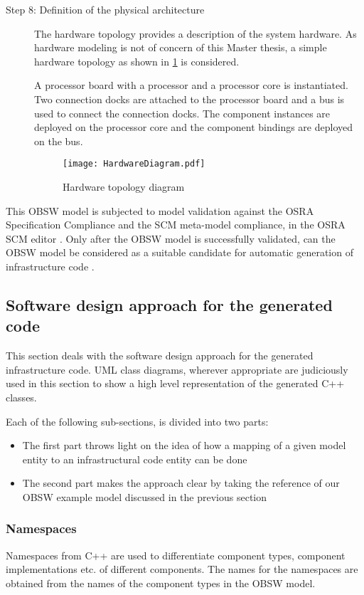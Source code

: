 \begin{description}
\item [Step 8: Definition of the physical architecture] The hardware topology provides a description of the system hardware. As hardware modeling is not of concern of this Master thesis, a simple hardware topology as shown in \cref{fig: Ex. Hardware topology} is considered. 

A processor board with a processor and a processor core is instantiated. Two connection docks are attached to the processor board and a bus is used to connect the connection docks. The component instances are deployed on the processor core and the component bindings are deployed on the bus.

\begin{figure}[h]
	\centering
	\texttt{[image: HardwareDiagram.pdf]}
	\caption{Hardware topology diagram}
	\label{fig: Ex. Hardware topology}
\end{figure}
 
\end{description}

This OBSW model is subjected to model validation against the OSRA Specification Compliance and the SCM meta-model compliance, in the OSRA SCM editor \cite{OSRAEditor}. Only after the OBSW model is successfully validated, can the OBSW model be considered as a suitable candidate for automatic generation of infrastructure code \cite{OSRAEditor}.  
   
\subsection{Software design approach for the generated code}
This section deals with the software design approach for the generated infrastructure code. UML class diagrams, wherever appropriate are judiciously used in this section to show a high level representation of the generated C++ classes. 

Each of the following sub-sections, is divided into two parts:
\begin{itemize}
\item The first part throws light on the idea of how a mapping of a given model entity to an infrastructural code entity can be done
\item The second part makes the approach clear by taking the reference of our OBSW example model discussed in the previous section  
\end{itemize}

\subsubsection{\textbf{Namespaces}}
Namespaces from C++ are used to differentiate component types, component implementations etc. of different components. The names for the namespaces are obtained from the names of the component types in the OBSW model.


